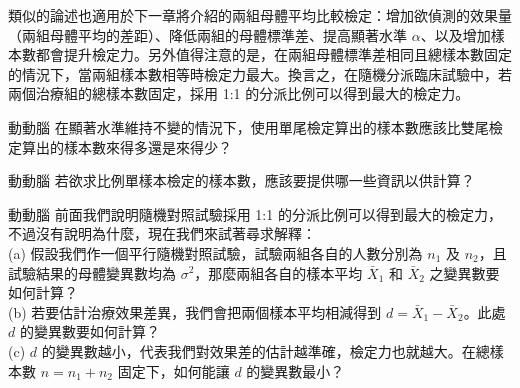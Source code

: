     \medskip

    類似的論述也適用於下一章將介紹的兩組母體平均比較檢定：增加欲偵測的效果量（兩組母體平均的差距）、降低兩組的母體標準差、提高顯著水準 $\alpha$、以及增加樣本數都會提升檢定力。另外值得注意的是，在兩組母體標準差相同且總樣本數固定的情況下，當兩組樣本數相等時檢定力最大。換言之，在隨機分派臨床試驗中，若兩個治療組的總樣本數固定，採用 1:1 的分派比例可以得到最大的檢定力。

    \pagebreak

    \begin{custom}{動動腦}
        在顯著水準維持不變的情況下，使用單尾檢定算出的樣本數應該比雙尾檢定算出的樣本數來得多還是來得少？
    \end{custom}

    \answerbox{120pt}

    \bigskip

    \begin{custom}{動動腦}
        若欲求比例單樣本檢定的樣本數，應該要提供哪一些資訊以供計算？
    \end{custom}

    \answerbox{120pt}

    \bigskip

    \begin{custom}{動動腦}
        前面我們說明隨機對照試驗採用 1:1 的分派比例可以得到最大的檢定力，不過沒有說明為什麼，現在我們來試著尋求解釋：\\
        (a) 假設我們作一個平行隨機對照試驗，試驗兩組各自的人數分別為 $n_1$ 及 $n_2$，且試驗結果的母體變異數均為 $\sigma^2$，那麼兩組各自的樣本平均 $\bar{X}_1$ 和 $\bar{X}_2$ 之變異數要如何計算？\\
        (b) 若要估計治療效果差異，我們會把兩個樣本平均相減得到 $d = \bar{X}_1 - \bar{X}_2$。此處 $d$ 的變異數要如何計算？\\
        (c) $d$ 的變異數越小，代表我們對效果差的估計越準確，檢定力也就越大。在總樣本數 $n = n_1 + n_2$ 固定下，如何能讓 $d$ 的變異數最小？
    \end{custom}

    \answerbox{210pt}

    \bigskip

